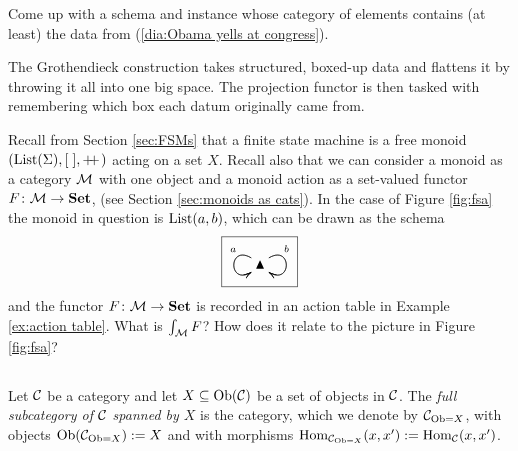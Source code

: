 \begin{exercise}
Come up with a schema and instance whose category of elements contains (at least) the data from (\ref{dia:Obama yells at congress}).
\end{exercise}

\begin{slogan}
The Grothendieck construction takes structured, boxed-up data and flattens it by throwing it all into one big space. The projection functor is then tasked with remembering which box each datum originally came from.
\end{slogan}

\begin{exercise}\label{exc:FSM as elements of monoid action}
Recall from Section \ref{sec:FSMs} that a finite state machine is a free monoid $(\textnormal{List}(\Sigma),[\;],+\!\!+\hspace{1pt})$ acting on a set $X$. Recall also that we can consider a monoid as a category $\mathcal{M}$ with one object and a monoid action as a set-valued functor $F\colon\mathcal{M}\rightarrow{\bf Set}$, (see Section \ref{sec:monoids as cats}). In the case of Figure \ref{fig:fsa} the monoid in question is $\textnormal{List}(a,b)$, which can be drawn as the schema
$$\fbox{\xymatrix{\monOb\ar@(ul,dl)[]_(.3)a\ar@(ul,dl)[]_(.7){~}\ar@(ur,dr)[]^(.3)b\ar@(ur,dr)[]^(.7){~}}}$$
and the functor $F\colon\mathcal{M}\rightarrow{\bf Set}$ is recorded in an action table in Example \ref{ex:action table}. What is $\int_\mathcal{M} F$? How does it relate to the picture in Figure \ref{fig:fsa}?
\end{exercise}


\subsection{}

\begin{definition}\label{def:full subcategory}

Let $\mathcal{C}$ be a category and let $X\subseteq\textnormal{Ob}(\mathcal{C})$ be a set of objects in $\mathcal{C}$. The {\em full subcategory of $\mathcal{C}$ spanned by $X$} is the category, which we denote by $\mathcal{C}_{\textnormal{Ob}=X}$, with objects $\textnormal{Ob}(\mathcal{C}_{\textnormal{Ob}=X}):=X$ and with morphisms $\textnormal{Hom}_{\mathcal{C}_{\textnormal{Ob}=X}}(x,x'):=\textnormal{Hom}_\mathcal{C}(x,x')$.

\end{definition}

